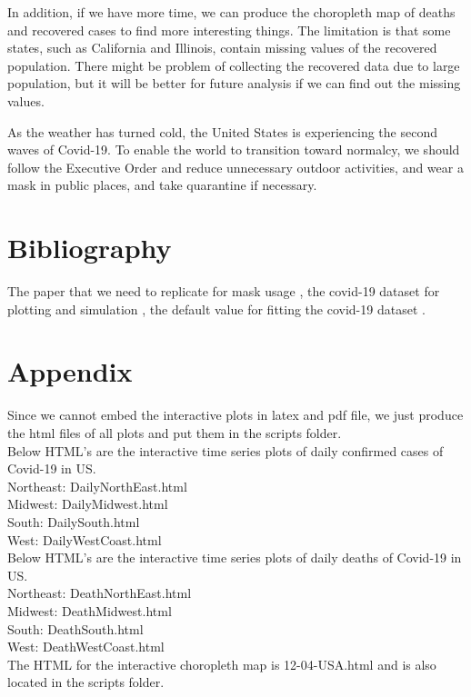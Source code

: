 \documentclass{article}
\begin{document}
In addition, if we have more time, we can produce the choropleth map of deaths and recovered cases to find more interesting things. The limitation is that some states, such as California and Illinois, contain missing values of the recovered population. There might be problem of collecting the recovered data due to large population, but it will be better for future analysis if we can find out the missing values.


As the weather has turned cold, the United States is experiencing the second waves of Covid-19. To enable the world to transition toward normalcy, we should follow the Executive Order and reduce unnecessary outdoor activities, and wear a mask in public places, and take quarantine if necessary.





\section{Bibliography}
The paper that we need to replicate for mask usage \cite{Steff2020mask},  the covid-19 dataset for plotting and simulation \cite{Johnhopkins}, the default value for fitting the covid-19 dataset \cite{Cooper2020SIR}.


\printbibliography






\section{Appendix}

Since we cannot embed the interactive plots in latex and pdf file, we just produce the html files of all plots and put them in the scripts folder.\\

\noindent
Below HTML's are the interactive time series plots of daily confirmed cases of Covid-19 in US.\\

Northeast: DailyNorthEast.html\\

Midwest: DailyMidwest.html\\

South: DailySouth.html\\

West: DailyWestCoast.html\\



\noindent
Below HTML's are the interactive time series plots of daily deaths of Covid-19 in US. \\

Northeast: DeathNorthEast.html\\

Midwest: DeathMidwest.html\\

South: DeathSouth.html\\

West: DeathWestCoast.html\\




\noindent
The HTML for the interactive choropleth map is 12-04-USA.html and is also located in the scripts folder. \\
\end{document}
